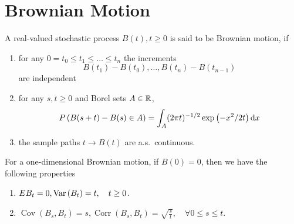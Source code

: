 \chapter{Brownian Motion}

\begin{definition}
	A real-valued stochastic process $B(t),t\geq 0$ is said to be Brownian motion, if
	\begin{enumerate}
		\item for any $0=t_{0}\leq t_{1}\leq\ldots\leq t_{n}$ the increments
		      \begin{equation*}
			      B\left(t_{1}\right)-B\left(t_{0}\right),\ldots,B\left(t_{n}\right)-B\left(t_{n-1}\right)
		      \end{equation*}
		      are independent
		\item for any $s,t\geq 0$ and Borel sets $A\in{\mathbb R}$,
		      \begin{equation}
			      P\left(B(s+t)-B(s)\in A\right)=\int_{A}(2\pi t)^{-1/2}\exp\left(-x^{2}/2t\right)\mathop{}\!\mathrm{d} x
		      \end{equation}
		\item the sample paths $t\rightarrow B(t)$ are a.s.\ continuous.
	\end{enumerate}
\end{definition}

\begin{property}
	For a one-dimensional Brownian motion, if $B(0)=0$, then we have the following properties
	\begin{enumerate}
		\item $EB_{t}=0,\mathrm{Var}\left(B_{t}\right)=t,\quad t\geq 0$.
		\item $\operatorname{Cov}\left(B_{s},B_{t}\right)=s,\operatorname{Corr}\left(B_{s},B_{t}\right)=\sqrt{\frac{s}{t}},\quad\forall 0\leq s\leq t$.
	\end{enumerate}
\end{property}

